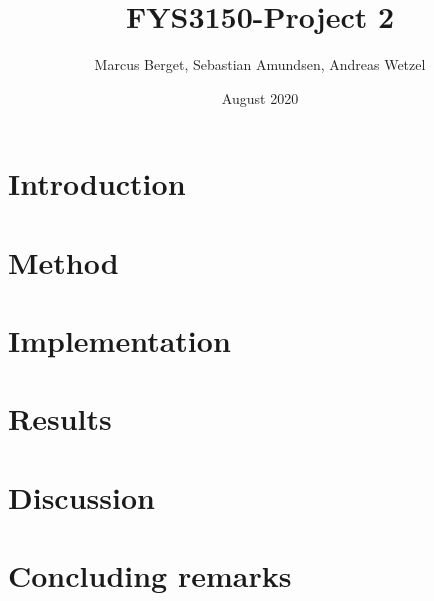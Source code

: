 \documentclass[norsk,a4paper,12pt]{article}
\begin{document}
\title{FYS3150-Project 2}
\author{Marcus Berget, Sebastian Amundsen, Andreas Wetzel}
\date{August 2020}
\maketitle

\begin{abstract}

\end{abstract}

\section{Introduction}

\section{Method}

\section{Implementation}

\section{Results}

\section{Discussion}


\section{Concluding remarks}


\end{document}
